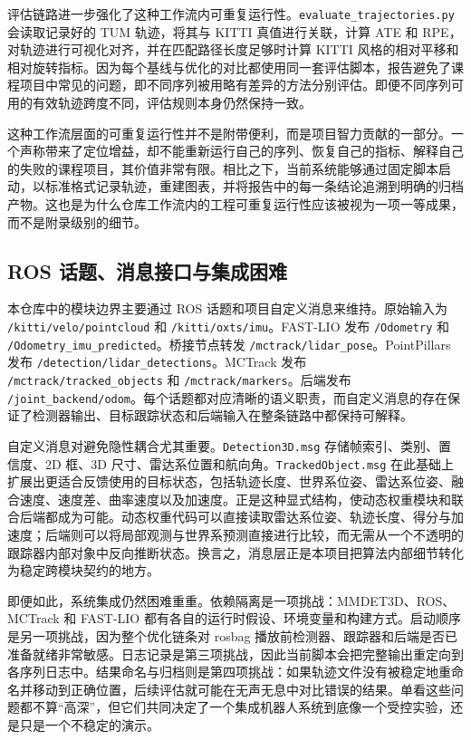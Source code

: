 \documentclass[utf8, a4paper, 12pt]{ctexart}
\begin{document}
评估链路进一步强化了这种工作流内可重复运行性。\texttt{evaluate\_trajectories.py} 会读取记录好的 TUM 轨迹，将其与 KITTI 真值进行关联，计算 ATE 和 RPE，对轨迹进行可视化对齐，并在匹配路径长度足够时计算 KITTI 风格的相对平移和相对旋转指标。因为每个基线与优化的对比都使用同一套评估脚本，报告避免了课程项目中常见的问题，即不同序列被用略有差异的方法分别评估。即便不同序列可用的有效轨迹跨度不同，评估规则本身仍然保持一致。

这种工作流层面的可重复运行性并不是附带便利，而是项目智力贡献的一部分。一个声称带来了定位增益，却不能重新运行自己的序列、恢复自己的指标、解释自己的失败的课程项目，其价值非常有限。相比之下，当前系统能够通过固定脚本启动，以标准格式记录轨迹，重建图表，并将报告中的每一条结论追溯到明确的归档产物。这也是为什么仓库工作流内的工程可重复运行性应该被视为一项一等成果，而不是附录级别的细节。

\subsection{ROS 话题、消息接口与集成困难}
本仓库中的模块边界主要通过 ROS 话题和项目自定义消息来维持。原始输入为 \texttt{/kitti/velo/pointcloud} 和 \texttt{/kitti/oxts/imu}。FAST-LIO 发布 \texttt{/Odometry} 和 \texttt{/Odometry\_imu\_predicted}。桥接节点转发 \texttt{/mctrack/lidar\_pose}。PointPillars 发布 \texttt{/detection/lidar\_detections}。MCTrack 发布 \texttt{/mctrack/tracked\_objects} 和 \texttt{/mctrack/markers}。后端发布 \texttt{/joint\_backend/odom}。每个话题都对应清晰的语义职责，而自定义消息的存在保证了检测器输出、目标跟踪状态和后端输入在整条链路中都保持可解释。

自定义消息对避免隐性耦合尤其重要。\texttt{Detection3D.msg} 存储帧索引、类别、置信度、2D 框、3D 尺寸、雷达系位置和航向角。\texttt{TrackedObject.msg} 在此基础上扩展出更适合反馈使用的目标状态，包括轨迹长度、世界系位姿、雷达系位姿、融合速度、速度差、曲率速度以及加速度。正是这种显式结构，使动态权重模块和联合后端都成为可能。动态权重代码可以直接读取雷达系位姿、轨迹长度、得分与加速度；后端则可以将局部观测与世界系预测直接进行比较，而无需从一个不透明的跟踪器内部对象中反向推断状态。换言之，消息层正是本项目把算法内部细节转化为稳定跨模块契约的地方。

即便如此，系统集成仍然困难重重。依赖隔离是一项挑战：MMDET3D、ROS、MCTrack 和 FAST-LIO 都有各自的运行时假设、环境变量和构建方式。启动顺序是另一项挑战，因为整个优化链条对 rosbag 播放前检测器、跟踪器和后端是否已准备就绪非常敏感。日志记录是第三项挑战，因此当前脚本会把完整输出重定向到各序列日志中。结果命名与归档则是第四项挑战：如果轨迹文件没有被稳定地重命名并移动到正确位置，后续评估就可能在无声无息中对比错误的结果。单看这些问题都不算“高深”，但它们共同决定了一个集成机器人系统到底像一个受控实验，还是只是一个不稳定的演示。
\end{document}
